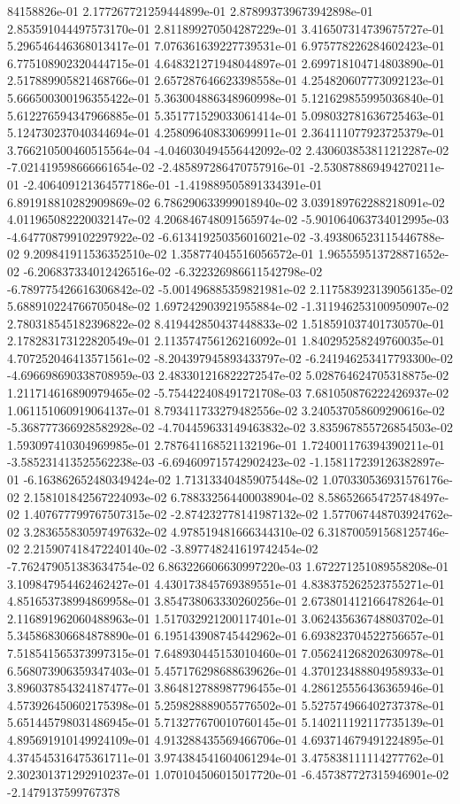 84158826e-01	2.177267721259444899e-01	2.878993739673942898e-01	2.853591044497573170e-01	2.811899270504287229e-01	3.416507314739675727e-01	5.296546446368013417e-01	7.076361639227739531e-01	6.975778226284602423e-01	6.775108902320444715e-01	4.648321271948044897e-01	2.699718104714803890e-01	2.517889905821468766e-01	2.657287646623398558e-01	4.254820607773092123e-01	5.666500300196355422e-01	5.363004886348960998e-01	5.121629855995036840e-01	5.612276594347966885e-01	5.351771529033061414e-01	5.098032781636725463e-01	5.124730237040344694e-01	4.258096408330699911e-01	2.364111077923725379e-01	3.766210500460515564e-04	-4.046030494556442092e-02	2.430603853811212287e-02	-7.021419598666661654e-02	-2.485897286470757916e-01	-2.530878869494270211e-01	-2.406409121364577186e-01	-1.419889505891334391e-01	6.891918810282909869e-02	6.786290633999018940e-02	3.039189762288218091e-02	4.011965082220032147e-02	4.206846748091565974e-02	-5.901064063734012995e-03	-4.647708799102297922e-02	-6.613419250356016021e-02	-3.493806523115446788e-02	9.209841911536352510e-02	1.358774045516056572e-01	1.965559513728871652e-02	-6.206837334012426516e-02	-6.322326986611542798e-02	-6.789775426616306842e-02	-5.001496885359821981e-02	2.117583923139056135e-02	5.688910224766705048e-02	1.697242903921955884e-02	-1.311946253100950907e-02	2.780318545182396822e-02	8.419442850437448833e-02	1.518591037401730570e-01	2.178283173122820549e-01	2.113574756126216092e-01	1.840295258249760035e-01	4.707252046413571561e-02	-8.204397945893433797e-02	-6.241946253417793300e-02	-4.696698690338708959e-03	2.483301216822272547e-02	5.028764624705318875e-02	1.211714616890979465e-02	-5.754422408491721708e-03	7.681050876222426937e-02	1.061151060919064137e-01	8.793411733279482556e-02	3.240537058609290616e-02	-5.368777366928582928e-02	-4.704459633149463832e-02	3.835967855726854503e-02	1.593097410304969985e-01	2.787641168521132196e-01	1.724001176394390211e-01	-3.585231413525562238e-03	-6.694609715742902423e-02	-1.158117239126382897e-01	-6.163862652480349424e-02	1.713133404859075448e-02	1.070330536931576176e-02	2.158101842567224093e-02	6.788332564400038904e-02	8.586526654725748497e-02	1.407677799767507315e-02	-2.874232778141987132e-02	1.577067448703924762e-02	3.283655830597497632e-02	4.978519481666344310e-02	6.318700591568125746e-02	2.215907418472240140e-02	-3.897748241619742454e-02	-7.762479051383634754e-02	6.863226606630997220e-03	1.672271251089558208e-01	3.109847954462462427e-01	4.430173845769389551e-01	4.838375262523755271e-01	4.851653738994869958e-01	3.854738063330260256e-01	2.673801412166478264e-01	2.116891962060488963e-01	1.517032921200117401e-01	3.062435636748803702e-01	5.345868306684878890e-01	6.195143908745442962e-01	6.693823704522756657e-01	7.518541565373997315e-01	7.648930445153010460e-01	7.056241268202630978e-01	6.568073906359347403e-01	5.457176298688639626e-01	4.370123488804958933e-01	3.896037854324187477e-01	3.864812788987796455e-01	4.286125556436365946e-01	4.573926450602175398e-01	5.259828889055776502e-01	5.527574966402737378e-01	5.651445798031486945e-01	5.713277670010760145e-01	5.140211192117735139e-01	4.895691910149924109e-01	4.913288435569466706e-01	4.693714679491224895e-01	4.374545316475361711e-01	3.974384541604061294e-01	3.475838111114277762e-01	2.302301371292910237e-01	1.070104506015017720e-01	-6.457387727315946901e-02	-2.1479137599767378